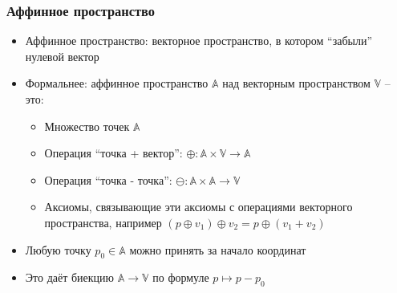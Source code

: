 \documentclass{beamer}
\begin{document}
\begin{frame}[fragile]
\frametitle{Аффинное пространство}
\begin{itemize}
\item Аффинное пространство: векторное пространство, в котором ``забыли''  нулевой вектор
\pause
\item Формальнее: аффинное пространство \begin{math}\mathbb A\end{math} над векторным пространством \begin{math}\mathbb V\end{math} -- это:
\pause
\begin{itemize}
\item Множество точек \begin{math}\mathbb A\end{math}
\pause
\item Операция ``точка + вектор'': \begin{math}\oplus: \mathbb A \times \mathbb V \rightarrow \mathbb A\end{math}
\pause
\item Операция ``точка - точка'': \begin{math}\ominus: \mathbb A \times \mathbb A \rightarrow \mathbb V\end{math}
\pause
\item Аксиомы, связывающие эти аксиомы с операциями векторного пространства, например
\begin{math}(p\oplus v_1)\oplus v_2 = p\oplus(v_1+v_2)\end{math}
\end{itemize}
\pause
\item Любую точку \begin{math}p_0\in \mathbb A\end{math} можно принять за начало координат
\item Это даёт биекцию \begin{math}\mathbb A \rightarrow \mathbb V\end{math} по формуле \begin{math}p \mapsto p - p_0\end{math}
\end{itemize}
\end{frame}
\end{document}
